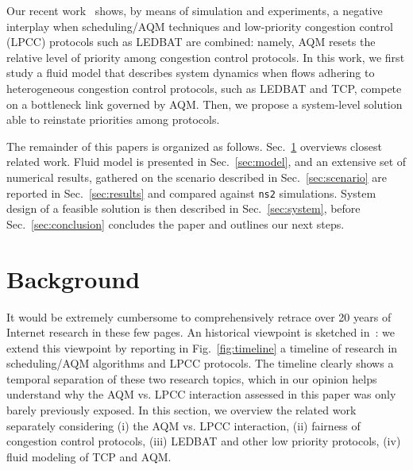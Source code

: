 \documentclass[conference]{IEEEtran}
\newcommand{\secR}[1]{Sec.~\ref{sec:#1}}
\newcommand{\secL}[1]{\label{sec:#1}}
\newcommand{\figR}[1]{Fig.~\ref{fig:#1}}
\begin{document}
Our recent work~\cite{tma13} shows, by means of simulation and experiments, a negative interplay when scheduling/AQM techniques and low-priority congestion control (LPCC) protocols such as LEDBAT are combined: namely, AQM resets the relative level of priority among congestion control protocols. In this work, we first study a fluid model that describes system dynamics when flows adhering to heterogeneous congestion control protocols, such as LEDBAT and TCP, compete on a bottleneck link governed by AQM. Then, we propose a system-level solution able to reinstate priorities among protocols.

The remainder of this papers is organized as follows. \secR{related} overviews closest related work. Fluid model is presented in \secR{model}, and an extensive set of numerical results, gathered on the scenario described in \secR{scenario} are reported in \secR{results} and compared against \verb!ns2! simulations. System design of a feasible solution is then described in \secR{system}, before \secR{conclusion} concludes the paper and outlines our next steps.


\section{Background}\secL{related}

It would be extremely cumbersome to comprehensively retrace over 20 years of Internet research in these few pages. An historical viewpoint is sketched in~\cite{darkbuffers12cacm}: we extend this viewpoint by reporting in \figR{timeline} a timeline of research in scheduling/AQM algorithms and LPCC protocols. The timeline clearly shows a temporal separation of these two research topics, which in our opinion helps understand why the AQM vs. LPCC interaction assessed in this paper was only barely previously exposed. In this section, we overview the related work separately considering (i) the AQM vs. LPCC interaction, (ii) fairness of congestion control protocols, (iii) LEDBAT and other low priority protocols, (iv) fluid modeling  of TCP and AQM.

~\\
\end{document}
